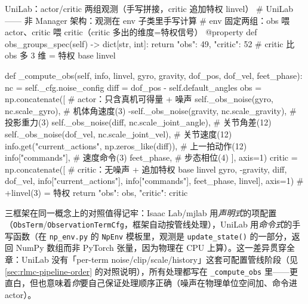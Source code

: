 \begin{codebox}[Python]{UniLab：actor/critic 两组观测（手写拼接，critic 追加特权 linvel）}
# UniLab —— 非 Manager 架构：观测在 env 子类里手写计算
# env 固定两组：obs 喂 actor、critic 喂 critic（critic 多出的维度=特权信号）
@property
def obs_groups_spec(self) -> dict[str, int]:
    return {"obs": 49, "critic": 52}        # critic 比 obs 多 3 维 = 特权 base linvel

def _compute_obs(self, info, linvel, gyro, gravity, dof_pos, dof_vel, feet_phase):
    nc = self._cfg.noise_config
    diff = dof_pos - self.default_angles
    obs = np.concatenate([                   # actor：只含真机可得量 + 噪声
        self._obs_noise(gyro, nc.scale_gyro),          # 机体角速度(3)
        -self._obs_noise(gravity, nc.scale_gravity),   # 投影重力(3)
        self._obs_noise(diff, nc.scale_joint_angle),   # 关节角差(12)
        self._obs_noise(dof_vel, nc.scale_joint_vel),  # 关节速度(12)
        info.get("current_actions", np.zeros_like(diff)),  # 上一拍动作(12)
        info["commands"],                              # 速度命令(3)
        feet_phase,                                    # 步态相位(4)
    ], axis=1)
    critic = np.concatenate([                # critic：无噪声 + 追加特权 base linvel
        gyro, -gravity, diff, dof_vel, info["current_actions"],
        info["commands"], feet_phase, linvel], axis=1)   # +linvel(3) = 特权
    return {"obs": obs, "critic": critic}
\end{codebox}

三框架在同一概念上的对照值得记牢：Isaac Lab/mjlab 用\emph{声明式}的项配置（\verb|ObsTerm|/\verb|ObservationTermCfg|，框架自动按管线处理），UniLab 用\emph{命令式}的手写函数（在 \verb|np_env.py| 的 \verb|NpEnv| 模板里，观测是 \verb|update_state()| 的一部分，返回 NumPy 数组而非 PyTorch 张量，因为物理在 CPU 上算）。这一差异贯穿全章：UniLab 没有「per-term noise/clip/scale/history」这套可配置管线阶段（见 \cref{sec:rlmc-pipeline-order} 的对照说明），所有处理都写在 \verb|_compute_obs| 里——更直白，但也意味着\emph{你}要自己保证处理顺序正确（噪声在物理单位空间加、命令进 actor）。


